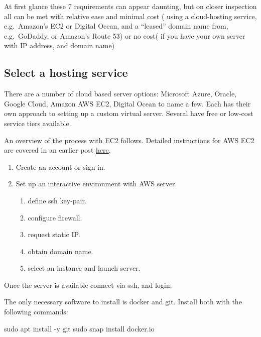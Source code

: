 \documentclass[
  letterpaper,
  DIV=11,
  numbers=noendperiod,
  oneside]{scrartcl}
\newenvironment{Shaded}{\begin{snugshade}}{\end{snugshade}}
\newcommand{\AttributeTok}[1]{\textcolor[rgb]{0.40,0.45,0.13}{#1}}
\newcommand{\FunctionTok}[1]{\textcolor[rgb]{0.28,0.35,0.67}{#1}}
\newcommand{\NormalTok}[1]{\textcolor[rgb]{0.00,0.23,0.31}{#1}}
\providecommand{\tightlist}{%
  \setlength{\itemsep}{0pt}\setlength{\parskip}{0pt}}\usepackage{longtable,booktabs,array}
\begin{document}
At first glance these 7 requirements can appear daunting, but on closer
inspection all can be met with relative ease and minimal cost ( using a
cloud-hosting service, e.g.~Amazon's EC2 or Digital Ocean, and a
``leased'' domain name from, e.g.~GoDaddy, or Amazon's Route 53) or no
cost( if you have your own server with IP address, and domain name)

\hypertarget{select-a-hosting-service}{%
\subsection{Select a hosting service}\label{select-a-hosting-service}}

There are a number of cloud based server options: Microsoft Azure,
Oracle, Google Cloud, Amazon AWS EC2, Digital Ocean to name a few. Each
has their own approach to setting up a custom virtual server. Several
have free or low-cost service tiers available.

An overview of the process with EC2 follows. Detailed instructions for
AWS EC2 are covered in an earlier post
\href{https://focusonr.org/posts/setupaws/}{here}.

\begin{enumerate}
\def\labelenumi{\arabic{enumi}.}
\setcounter{enumi}{-1}
\tightlist
\item
  Create an account or sign in.
\item
  Set up an interactive environment with AWS server.

  \begin{enumerate}
  \def\labelenumii{\alph{enumii}.}
  \tightlist
  \item
    define ssh key-pair.
  \item
    configure firewall.
  \item
    request static IP.
  \item
    obtain domain name.
  \item
    select an instance and launch server.
  \end{enumerate}
\end{enumerate}

Once the server is available connect via ssh, and login,

The only necessary software to install is docker and git. Install both
with the following commands:

\begin{Shaded}
\begin{Highlighting}[]
\FunctionTok{sudo}\NormalTok{ apt install }\AttributeTok{{-}y}\NormalTok{ git}
\FunctionTok{sudo}\NormalTok{ snap install docker.io}
\end{Highlighting}
\end{Shaded}
\end{document}
